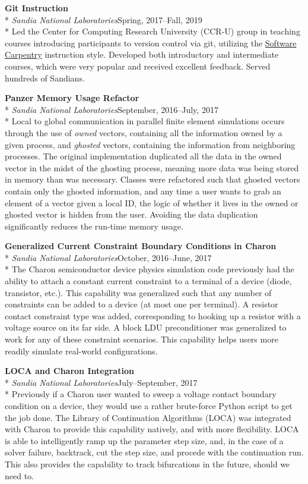 \documentclass[margin,line,pifont,palatino,10pt]{res}
\begin{document}
\begin{resume}
\pagebreak
{\bf Git Instruction}\\*
{\it Sandia National Laboratories}\hfill Spring, 2017--Fall, 2019\\*
Led the Center for Computing Research University (CCR-U) group in teaching courses introducing participants to version control via git, utilizing the \href{https://carpentries.org}{Software Carpentry} instruction style.  Developed both introductory and intermediate courses, which were very popular and received excellent feedback.  Served hundreds of Sandians.

{\bf Panzer Memory Usage Refactor}\\*
{\it Sandia National Laboratories}\hfill September, 2016--July, 2017\\*
Local to global communication in parallel finite element simulations occurs through the use of \emph{owned} vectors, containing all the information owned by a given process, and \emph{ghosted} vectors, containing the information from neighboring processes.  The original implementation duplicated all the data in the owned vector in the midst of the ghosting process, meaning more data was being stored in memory than was necessary.  Classes were refactored such that ghosted vectors contain only the ghosted information, and any time a user wants to grab an element of a vector given a local ID, the logic of whether it lives in the owned or ghosted vector is hidden from the user.  Avoiding the data duplication significantly reduces the run-time memory usage.

{\bf Generalized Current Constraint Boundary Conditions in Charon}\\*
{\it Sandia National Laboratories}\hfill October, 2016--June, 2017\\*
The Charon semiconductor device physics simulation code previously had the ability to attach a constant current constraint to a terminal of a device (diode, transistor, etc.).  This capability was generalized such that any number of constraints can be added to a device (at most one per terminal).  A resistor contact constraint type was added, corresponding to hooking up a resistor with a voltage source on its far side.  A block LDU preconditioner was generalized to work for any of these constraint scenarios.  This capability helps users more readily simulate real-world configurations.

{\bf LOCA and Charon Integration}\\*
{\it Sandia National Laboratories}\hfill July--September, 2017\\*
Previously if a Charon user wanted to sweep a voltage contact boundary condition on a device, they would use a rather brute-force Python script to get the job done.  The Library of Continuation Algorithms (LOCA) was integrated with Charon to provide this capability natively, and with more flexibility.  LOCA is able to intelligently ramp up the parameter step size, and, in the case of a solver failure, backtrack, cut the step size, and procede with the continuation run.  This also provides the capability to track bifurcations in the future, should we need to.


\end{resume}
\end{document}
